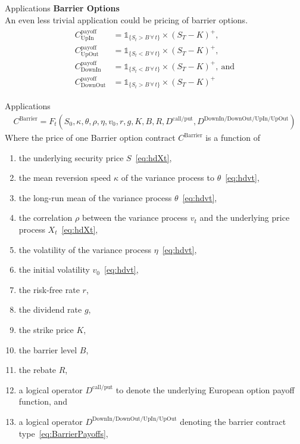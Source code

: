 \documentclass[aspectratio=169,xcolor=dvipsnames]{beamer}
\begin{document}
		\begin{frame}{Applications}
		\large{\textbf{Barrier Options}} \\
		An even less trivial application could be pricing of barrier options.
			\begin{align}
				\begin{aligned}
					C^{\text{payoff}}_{\text{UpIn}} &= \mathbb{1}_{\{ S_t > B \,\forall\, t \}} \times (S_{T}-K)^{+}, \\
					C^{\text{payoff}}_{\text{UpOut}} &= \mathbb{1}_{\{ S_t < B \,\forall\, t \}} \times (S_{T}-K)^{+}, \\
					C^{\text{payoff}}_{\text{DownIn}} &= \mathbb{1}_{\{ S_t < B \,\forall\, t \}} \times (S_{T}-K)^{+}, \: \text{and} \\
					C^{\text{payoff}}_{\text{DownOut}} &= \mathbb{1}_{\{ S_t > B \,\forall\, t \}} \times (S_{T}-K)^{+}
				\end{aligned}
				\label{eq:BarrierPayoffs}
			\end{align}
		\end{frame}
		
		\begin{frame}{Applications}
			\begin{align}
				C^{\text{Barrier}} = F_{t}(S_0, \kappa, \theta, \rho, \eta, v_{0}, r, g, K, B, R, D^{\text{call/put}}, D^{\text{DownIn/DownOut/UpIn/UpOut}}) \label{eq:Cbarrier}
			\end{align}
			\vfill
			Where the price of one Barrier option contract $C^{\text{Barrier}}$ is a function of
			\begin{enumerate}
				\small
				\item the underlying security price $S$~\eqref{eq:hdXt}, 
				\item the mean reversion speed $\kappa$ of the variance process to $\theta$~\eqref{eq:hdvt}, 
				\item the long-run mean of the variance process $\theta$~\eqref{eq:hdvt}, 
				\item the correlation $\rho$ between the variance process $v_t$ and the underlying price process $X_t$~\eqref{eq:hdXt}, 
				\item the volatility of the variance process $\eta$~\eqref{eq:hdvt}, 
				\item the initial volatility $v_{0}$~\eqref{eq:hdvt}, 
				\item the risk-free rate $r$, 
				\item the dividend rate $g$, 
				\item the strike price $K$, 
				\item the barrier level $B$, 
				\item the rebate $R$, 
				\item a logical operator $D^{\text{call/put}}$ to denote the underlying European option payoff function, and
				\item a logical operator $D^{\text{DownIn/DownOut/UpIn/UpOut}}$ denoting the barrier contract type~\eqref{eq:BarrierPayoffs},
			\end{enumerate}
		\end{frame}
	
\end{document}
